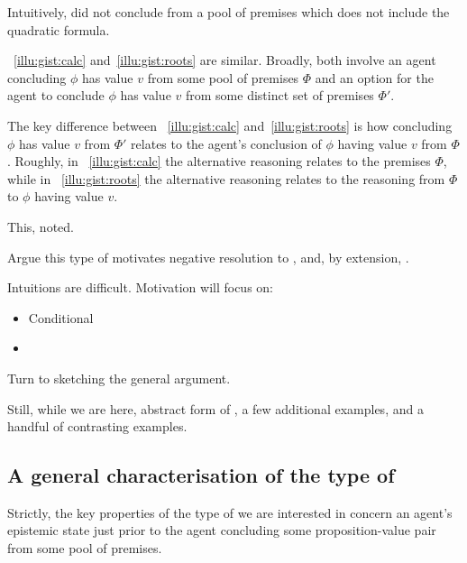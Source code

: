 \begin{note}
  Intuitively, did not conclude from a pool of premises which does not include the quadratic formula.
\end{note}

\begin{note}
  ~\ref{illu:gist:calc} and~\ref{illu:gist:roots} are similar.
  Broadly, both involve an agent concluding \(\phi\) has value \(v\) from some pool of premises \(\Phi\) and an option for the agent to conclude \(\phi\) has value \(v\) from some distinct set of premises \(\Phi'\).

  The key difference between ~\ref{illu:gist:calc} and~\ref{illu:gist:roots} is how concluding \(\phi\) has value \(v\) from \(\Phi'\) relates to the agent's conclusion of \(\phi\) having value \(v\) from \(\Phi\).
  Roughly, in ~\ref{illu:gist:calc} the alternative reasoning relates to the premises \(\Phi\), while in ~\ref{illu:gist:roots} the alternative reasoning relates to the reasoning from \(\Phi\) to \(\phi\) having value \(v\).

  This, noted.

  Argue this type of  motivates negative resolution to \issueConstraint{}, and, by extension, \issueInclusion{}.

  Intuitions are difficult.
  Motivation will focus on:
  \begin{itemize}
  \item
    Conditional
  \item
  \end{itemize}

  Turn to sketching the general argument.

  Still, while we are here, abstract form of , a few additional examples, and a handful of contrasting examples.
\end{note}

\subsection[General characterisation]{A general characterisation of the type of }

\begin{note}
  Strictly, the key properties of the type of  we are interested in concern an agent's epistemic state just prior to the agent concluding some proposition-value pair from some pool of premises.
\end{note}

